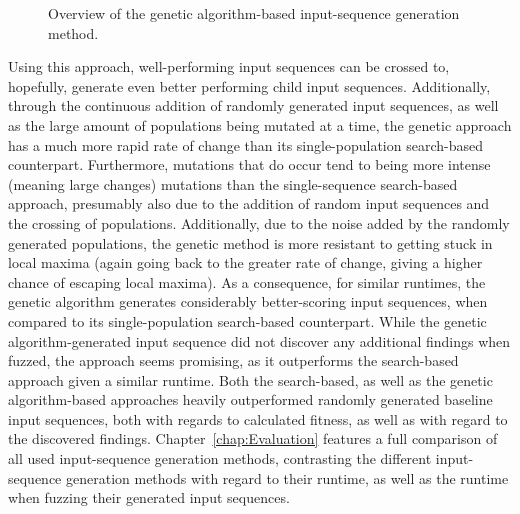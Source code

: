 \begin{figure}[H]
	\begin{centering}
\caption{Overview of the genetic algorithm-based input-sequence generation method.}
\label{fig:fuzz_genetic}
\end{centering}
\end{figure}

\vspace*{2mm}
Using this approach, well-performing input sequences can be crossed to, hopefully, generate even better performing child input sequences. Additionally, through the continuous addition of randomly generated input sequences, as well as the large amount of populations being mutated at a time, the genetic approach has a much more rapid rate of change than its single-population search-based counterpart. Furthermore, mutations that do occur tend to being more intense (meaning large changes) mutations than the single-sequence search-based approach, presumably also due to the addition of random input sequences and the crossing of populations. Additionally, due to the noise added by the randomly generated populations, the genetic method is more resistant to getting stuck in local maxima (again going back to the greater rate of change, giving a higher chance of escaping local maxima). As a consequence, for similar runtimes, the genetic algorithm generates considerably better-scoring input sequences, when compared to its single-population search-based counterpart. While the genetic algorithm-generated input sequence did not discover any additional findings when fuzzed, the approach seems promising, as it outperforms the search-based approach given a similar runtime. Both the search-based, as well as the genetic algorithm-based approaches heavily outperformed randomly generated baseline input sequences, both with regards to calculated fitness, as well as with regard to the discovered findings. Chapter~\ref{chap:Evaluation} features a full comparison of all used input-sequence generation methods, contrasting the different input-sequence generation methods with regard to their runtime, as well as the runtime when fuzzing their generated input sequences.
